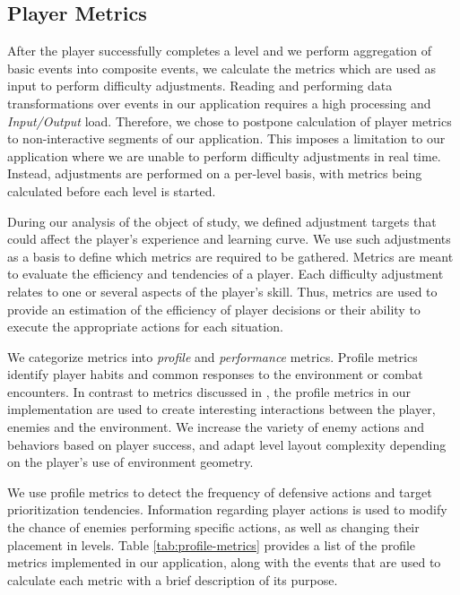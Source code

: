 

\subsection{Player Metrics}

After the player successfully completes a level and we perform aggregation of basic events into composite events, we calculate the metrics which are used as input to perform difficulty adjustments. Reading and performing data transformations over events in our application requires a high processing and \emph{Input/Output} load. Therefore, we chose to postpone calculation of player metrics to  non-interactive segments of our application. This imposes a limitation to our application where we are unable to perform difficulty adjustments in real time. Instead, adjustments are performed on a per-level basis, with metrics being calculated before each level is started.

During our analysis of the object of study, we defined adjustment targets that could affect the player's experience and learning curve. We use such adjustments as a basis to define which metrics are required to be gathered. Metrics are meant to evaluate the efficiency and tendencies of a player. Each difficulty adjustment relates to one or several aspects of the player's skill. Thus, metrics are used to provide an estimation of the efficiency of player decisions or their ability to execute the appropriate actions for each situation.

We categorize metrics into \emph{profile} and \emph{performance} metrics. Profile metrics identify player habits and common responses to the environment or combat encounters. In contrast to metrics discussed in \citet{ARTICLE_DynamicPlayerModelling}, the profile metrics in our implementation are used to create interesting interactions between the player, enemies and the environment. We increase the variety of enemy actions and behaviors based on player success, and adapt level layout complexity depending on the player's use of environment geometry.

We use profile metrics to detect the frequency of defensive actions and target prioritization tendencies. Information regarding player actions is used to modify the chance of enemies performing specific actions, as well as changing their placement in levels.  Table \ref{tab:profile-metrics} provides a list of the profile metrics implemented in our application, along with the events that are used to calculate each metric with a brief description of its purpose.

